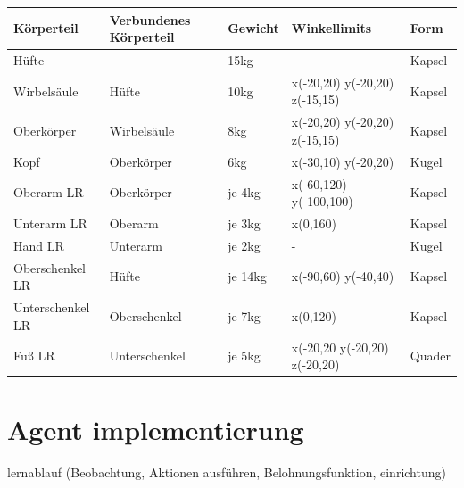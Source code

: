 \begin{center}
{
\begin{tabular}{ |p{3cm}|p{3cm}|p{2cm}|p{4cm}|p{2cm}| }
\hline
Körperteil& Verbundenes Körperteil & Gewicht & Winkellimits & Form \\
\hline
Hüfte & - & 15kg & - & Kapsel \\
Wirbelsäule & Hüfte & 10kg & x(-20,20) y(-20,20) z(-15,15) & Kapsel \\
Oberkörper & Wirbelsäule & 8kg & x(-20,20) y(-20,20) z(-15,15) & Kapsel \\
Kopf & Oberkörper & 6kg & x(-30,10) y(-20,20) & Kugel \\
Oberarm LR & Oberkörper & je 4kg & x(-60,120) y(-100,100) & Kapsel \\
Unterarm LR & Oberarm & je 3kg & x(0,160) & Kapsel \\
Hand LR & Unterarm & je 2kg & - & Kugel \\
Oberschenkel LR & Hüfte & je 14kg& x(-90,60) y(-40,40) & Kapsel \\
Unterschenkel LR & Oberschenkel & je 7kg &  x(0,120) & Kapsel \\
Fuß LR & Unterschenkel & je 5kg & x(-20,20 y(-20,20) z(-20,20) & Quader \\
\hline
\end{tabular}}
\end{center}

\section{Agent implementierung}
lernablauf (Beobachtung, Aktionen ausführen, Belohnungsfunktion, einrichtung)

